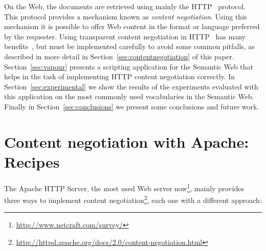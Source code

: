 \documentclass{../templates/llncs}
\begin{document}
On the Web, the documents are retrieved using mainly the HTTP~\cite{HTTP} 
protocol. This protocol provides a mechanism known as \textit{content negotiation}. 
Using this mechanism it is possible to offer Web content in the format or 
language preferred by the requester. Using transparent content negotiation 
in HTTP~\cite{Holtman1998} has many benefits~\cite{Seshan1998}, but must be 
implemented carefully to avoid some common pitfalls, as described in more detail in 
Section~\ref{sec:contentnegotiation} of this paper. Section~\ref{sec:vapour} presents 
a scripting application for the Semantic Web that helps in the task of implementing 
HTTP content negotiation correctly. In Section~\ref{sec:experimental} we show the
results of the experiments evaluated with this application on the most commonly used
vocabularies in the Semantic Web. Finally in Section~\ref{sec:conclusions} we present 
some conclusions and future work.


\section{\label{sec:contentnegotiation}Content negotiation with Apache: Recipes}


The Apache HTTP Server, the most used Web server
now\footnote{\url{http://www.netcraft.com/survey/}}, 
mainly provides three ways to implement content negotiation\footnote{\url{http://httpd.apache.org/docs/2.0/content-negotiation.html}}, 
each one with a different approach:
\end{document}
